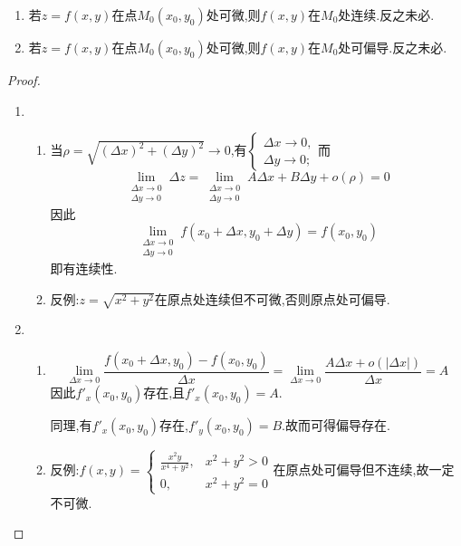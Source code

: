 \begin{theorem}
    \begin{enumerate}
        \item 若$z=f(x,y)$在点$M_0(x_0,y_0)$处可微,则$f(x,y)$在$M_0$处连续.反之未必.
        \item 若$z=f(x,y)$在点$M_0(x_0,y_0)$处可微,则$f(x,y)$在$M_0$处可偏导.反之未必.
    \end{enumerate}
\end{theorem}
\begin{proof}
    \begin{enumerate}
        \item 
            \begin{enumerate}
                \item 当$\rho=\sqrt{(\Delta x)^2+(\Delta y)^2}\to 0$,有$\begin{cases}
                \Delta x\to 0,\\
                \Delta y\to 0;
                \end{cases}$而$$\lim_{\substack{\Delta x\to 0\\\Delta y \to 0}}\Delta z=\lim_{\substack{\Delta x\to 0\\\Delta y \to 0}}A\Delta x+B\Delta y+o(\rho)=0$$
                因此$$\lim_{\substack{\Delta x\to 0\\\Delta y \to 0}}f(x_0+\Delta x,y_0+\Delta y)=f(x_0,y_0)$$
                即有连续性.
                \item 反例:$z=\sqrt{x^2+y^2}$在原点处连续但不可微,否则原点处可偏导.
            \end{enumerate}
        \item 
            \begin{enumerate}
                \item $$\lim_{\Delta x\to 0}\frac{f(x_0+\Delta x,y_0)-f(x_0,y_0)}{\Delta x}=\lim_{\Delta x\to 0}\frac{A\Delta x+o(|\Delta x|)}{\Delta x}=A$$
                因此$f'_x(x_0,y_0)$存在,且$f'_x(x_0,y_0)=A$.
        
                同理,有$f'_x(x_0,y_0)$存在,$f'_y(x_0,y_0)=B$.故而可得偏导存在.
                \item 反例:$f(x,y)=\begin{cases}
                    \frac{x^2y}{x^4+y^2},&x^2+y^2>0\\
                    0,&x^2+y^2=0
                \end{cases}$在原点处可偏导但不连续,故一定不可微.
            \end{enumerate}
    \end{enumerate}
\end{proof}

